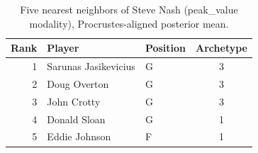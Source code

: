 \begin{table}[htbp]
  \centering\small
  \begin{tabular}{rllc}
    \toprule
    Rank & Player & Position & Archetype \\
    \midrule
    1 & Sarunas Jasikevicius & G & 3 \\
    2 & Doug Overton & G & 3 \\
    3 & John Crotty & G & 3 \\
    4 & Donald Sloan & G & 1 \\
    5 & Eddie Johnson & F & 1 \\
    \bottomrule
  \end{tabular}
  \caption{Five nearest neighbors of Steve Nash (peak_value modality), Procrustes-aligned posterior mean.}
  \label{tab:Steve_Nash_neighbors_peak_value}
\end{table}

